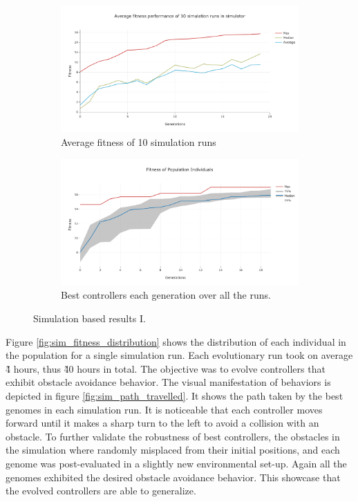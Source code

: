 \begin{figure}[H]
    \centering
    \begin{subfigure}[b]{0.8\textwidth}
    	\centering
        \includegraphics[width=14cm]{include/images/sim_avg_fitness.PNG}
        \caption{Average fitness of 10 simulation runs}
        \label{fig:sim_avg_fitness}
    \end{subfigure}
    \begin{subfigure}[b]{0.8\textwidth}
    	\centering
        \includegraphics[width=14cm]{include/images/sim_best_genomes_percentile.PNG}
        \caption{Best controllers each generation over all the runs.}
        \label{fig:sim_best_genomes_percentile}
    \end{subfigure}
    \caption{Simulation based results I.}
	\label{fig:sim_based_resultsI}
\end{figure}

Figure \ref{fig:sim_fitness_distribution} shows the distribution of each individual in the population for a single simulation run. Each evolutionary run took on average \~4 hours, thus \~40 hours in total. The objective was to evolve controllers that exhibit obstacle avoidance behavior. The visual manifestation of behaviors is depicted in figure \ref{fig:sim_path_travelled}. It shows the path taken by the best genomes in each simulation run. It is noticeable that each controller moves forward until it makes a sharp turn to the left to avoid a collision with an obstacle. To further validate the robustness of best controllers, the obstacles in the simulation where randomly misplaced from their initial positions, and each genome was post-evaluated in a slightly new environmental set-up. Again all the genomes exhibited the desired obstacle avoidance behavior. This showcase that the evolved controllers are able to generalize.

